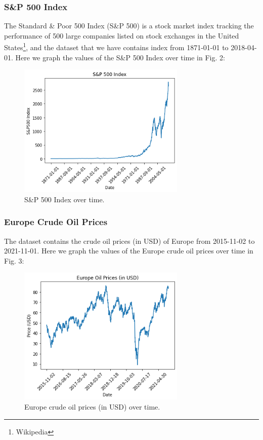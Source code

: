 \documentclass[letterpaper, 10 pt, conference]{ieeeconf}  %
\begin{document}
    \subsubsection{S\&P 500 Index} The Standard \& Poor 500 Index (S\&P 500) is a stock market index tracking the performance of 500 large companies listed on stock exchanges in the United States\footnote{Wikipedia}, and the dataset that we have contains index from 1871-01-01 to 2018-04-01. Here we graph the values of the S\&P 500 Index over time in Fig. 2:

    \begin{figure}[thpb]
        \centering
        \includegraphics[width=8cm]{2.png}
        \caption{S\&P 500 Index over time.}
        \label{figurelabel}
     \end{figure}

     \subsubsection{Europe Crude Oil Prices} The dataset contains the crude oil prices (in USD) of Europe from 2015-11-02 to 2021-11-01. Here we graph the values of the Europe crude oil prices over time in Fig. 3:

     \begin{figure}[thpb]
         \centering
         \includegraphics[width=8cm]{3.png}
         \caption{Europe crude oil prices (in USD) over time.}
         \label{figurelabel}
      \end{figure}
\end{document}
